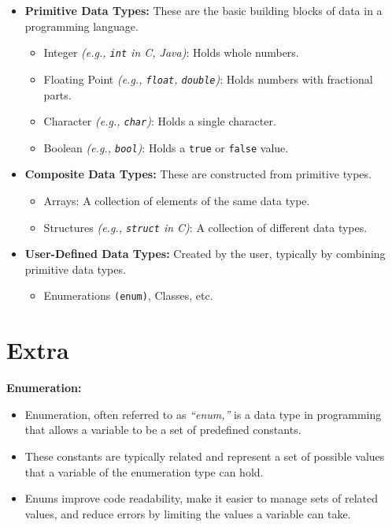 \documentclass[
  letterpaper,
  DIV=11,
  numbers=noendperiod]{scrreprt}
\providecommand{\tightlist}{%
  \setlength{\itemsep}{0pt}\setlength{\parskip}{0pt}}
\begin{document}
\begin{itemize}
\item
  \textbf{Primitive Data Types:} These are the basic building blocks of
  data in a programming language.

  \begin{itemize}
  \tightlist
  \item
    Integer \emph{(e.g., \texttt{int} in C, Java)}: Holds whole numbers.
  \item
    Floating Point \emph{(e.g., \texttt{float}, \texttt{double})}: Holds
    numbers with fractional parts.
  \item
    Character \emph{(e.g., \texttt{char})}: Holds a single character.
  \item
    Boolean \emph{(e.g., \texttt{bool})}: Holds a \texttt{true} or
    \texttt{false} value.
  \end{itemize}
\item
  \textbf{Composite Data Types:} These are constructed from primitive
  types.

  \begin{itemize}
  \tightlist
  \item
    Arrays: A collection of elements of the same data type.
  \item
    Structures \emph{(e.g., \texttt{struct} in C)}: A collection of
    different data types.
  \end{itemize}
\item
  \textbf{User-Defined Data Types:} Created by the user, typically by
  combining primitive data types.

  \begin{itemize}
  \tightlist
  \item
    Enumerations \texttt{(enum)}, Classes, etc.
  \end{itemize}
\end{itemize}

\section{Extra}

\textbf{Enumeration:}

\begin{itemize}
\tightlist
\item
  Enumeration, often referred to as \emph{``enum,''} is a data type in
  programming that allows a variable to be a set of predefined
  constants.
\item
  These constants are typically related and represent a set of possible
  values that a variable of the enumeration type can hold.
\item
  Enums improve code readability, make it easier to manage sets of
  related values, and reduce errors by limiting the values a variable
  can take.
\end{itemize}
\end{document}
